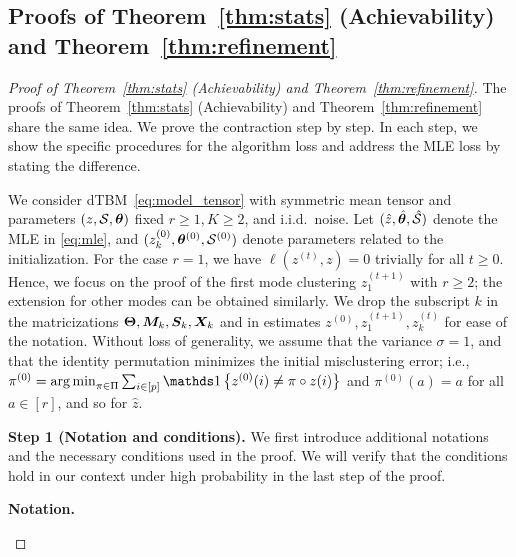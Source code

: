 \documentclass[journal]{IEEEtran}
\theoremstyle{definition}
\theoremstyle{definition}
\newcommand{\offf}[1]{\left\{#1\right\}}
\begin{document}
\subsection{Proofs of Theorem~\ref{thm:stats} (Achievability) and Theorem~\ref{thm:refinement}}\label{sec:statprove2}


\begin{proof}[Proof of Theorem~\ref{thm:stats} (Achievability) and Theorem~\ref{thm:refinement}]



The proofs of Theorem~\ref{thm:stats} (Achievability) and Theorem~\ref{thm:refinement} share the same idea. We prove the contraction step by step. In each step, we show the specific procedures for the algorithm loss and address the MLE loss by stating the difference. 

We consider dTBM~\eqref{eq:model_tensor} with symmetric mean tensor and parameters $(z, \mathcal{S}, \boldsymbol{\theta})$ {fixed $r\geq 1, K \geq 2$}, and i.i.d.\ noise.  Let $(\hat z, \hat {\boldsymbol{\theta}}, \hat {\mathcal{S}})$ denote the MLE in \eqref{eq:mle}, and $(z^{(0)}_k, \boldsymbol{\theta}^{(0)}, \mathcal{S}^{(0)})$ denote parameters related to the initialization.  {For the case $r = 1$, we have $\ell(z^{(t)}, z) = 0$ trivially for all $t \geq 0$. Hence, we focus on the proof of the first mode clustering $z^{(t+1)}_1$ with $r \geq 2$}; 
the extension for other modes can be obtained similarly. We drop the subscript $k$ in the matricizations $\boldsymbol{\Theta}, \bm M_k, \bm S_k, \bm X_k$ and in estimates $z^{(0)}, z^{(t+1)}_1, z^{(t)}_k$ for ease of the notation.  Without loss of generality, we assume that the variance $\sigma = 1$, and that the identity permutation minimizes the initial misclustering error; i.e., $\pi^{(0)} = \argmin_{\pi \in \Pi} \sum_{i \in [p]}\ind \offf{z^{(0)}(i) \neq \pi \circ z(i) }$ and $\pi^{(0)}(a) = a$ for all $ a \in [r]$, and so for $\hat z$. 




{\bf Step 1 (Notation and conditions).} We first introduce additional notations and the necessary conditions used in the proof. We will verify that the conditions hold in our context under high probability in the last step of the proof. 

{
  

\textbf{Notation.}
\begin{enumerate}[wide]


\end{enumerate}}
\end{proof}
\end{document}

